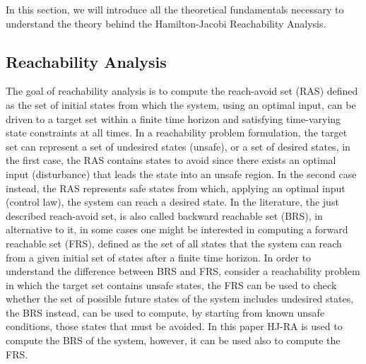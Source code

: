 In this section, we will introduce all the theoretical fundamentals necessary to understand the theory behind the Hamilton-Jacobi Reachability Analysis.

\subsection{Reachability Analysis}
The goal of reachability analysis is to compute the reach-avoid set (RAS) defined as the set of initial states from which the system, using an optimal input, can be driven to a target set within a finite time horizon and satisfying time-varying state constraints at all times. In a reachability problem formulation, the target set can represent a set of undesired states (unsafe), or a set of desired states, in the first case, the RAS contains states to avoid since there exists an optimal input (disturbance) that leads the state into an unsafe region. In the second case instead, the RAS represents safe states from which, applying an optimal input (control law), the system can reach a desired state. 
In the literature, the just described reach-avoid set, is also called backward reachable set (BRS), in alternative to it, in some cases one might be interested in computing a forward reachable set (FRS), defined as the set of all states that the system can reach from a given initial set of states after a finite time horizon. In order to understand the difference between BRS and FRS, consider a reachability problem in which the target set contains unsafe states, the FRS can be used to check whether the set of possible future states of the system includes undesired states, the BRS instead, can be used to compute, by starting from known unsafe conditions, those states that must be avoided. In this paper HJ-RA is used to compute the BRS of the system, however, it can be used also to compute the FRS. 

